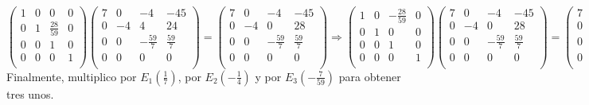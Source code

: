 \documentclass[11pt, a4paper]{article}
\newif\IfInSansMode
\theoremstyle{theorem-style}
\theoremstyle{definition-style}
\theoremstyle{remark-style}
\theoremstyle{example-style}
\begin{document}
$\begin{pmatrix}
1 & 0 & 0 & 0\\
0 & 1 & \frac{28}{59} & 0\\
0 & 0 & 1 & 0\\
0 & 0 & 0 & 1 \\
\end{pmatrix} 
\begin{pmatrix}
7 & 0 & -4 & -45 \\
0 & -4 & 4 & 24 \\
0 & 0 & -\frac{59}{7} & \frac{59}{7} \\
0 & 0 & 0 & 0 \\
\end{pmatrix} = 
\begin{pmatrix}
7 & 0 & -4 & -45 \\
0 & -4 & 0 & 28 \\
0 & 0 & -\frac{59}{7} & \frac{59}{7} \\
0 & 0 & 0 & 0 \\
\end{pmatrix} \Longrightarrow
\begin{pmatrix}
1 & 0 & -\frac{28}{59} & 0\\
0 & 1 & 0 & 0\\
0 & 0 & 1 & 0\\
0 & 0 & 0 & 1 \\
\end{pmatrix}   
\begin{pmatrix}
7 & 0 & -4 & -45 \\
0 & -4 & 0 & 28 \\
0 & 0 & -\frac{59}{7} & \frac{59}{7} \\
0 & 0 & 0 & 0 \\
\end{pmatrix} = 
\begin{pmatrix}
7 & 0 & 0 & -49 \\
0 & -4 & 0 & 28 \\
0 & 0 & -\frac{59}{7} & \frac{59}{7} \\
0 & 0 & 0 & 0 \\
\end{pmatrix}$ \\

Finalmente, multiplico por $E_1(\frac{1}{7})$, por $E_2(-\frac{1}{4})$ y por $E_3(-\frac{7}{59})$ para obtener tres unos. \\
\end{document}
